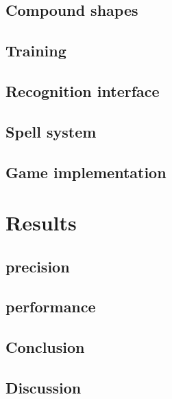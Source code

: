 \section{Compound shapes}

\section{Training}

\section{Recognition interface}

\section{Spell system}

\section{Game implementation}

\chapter{Results}

\section{precision}

\section{performance}

\section{Conclusion}

\section{Discussion}

